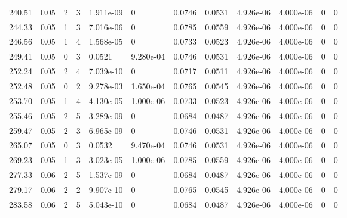 \documentclass[preview]{standalone}
\begin{document}
{{{\begin{tabular}{L{1.2cm}C{1.2cm} C{0.3cm}C{0.5cm} C{1.4cm}C{1.4cm} C{1.4cm}C{1.4cm} C{1.6cm}C{1.6cm} C{1.6cm}C{1.6cm}}
  240.51  &  0.05  & 2     &  3 &  1.911e-09  & 0  &  0.0746&   0.0531& 4.926e-06 & 4.000e-06   &  0 & 0  \\ 
  244.33  &  0.05  & 1     &  3 &  7.016e-06  & 0  &  0.0785&   0.0559& 4.926e-06 & 4.000e-06   &  0 & 0  \\ 
  246.56  &  0.05  & 1     &  4 &  1.568e-05  & 0  &  0.0733&   0.0523& 4.926e-06 & 4.000e-06   &  0 & 0  \\ 
  249.41  &  0.05  & 0     &  3 &  0.0521  & 9.280e-04  &  0.0746&   0.0531& 4.926e-06 & 4.000e-06   &  0 & 0  \\ 
  252.24  &  0.05  & 2     &  4 &  7.039e-10  & 0  &  0.0717&   0.0511& 4.926e-06 & 4.000e-06   &  0 & 0  \\ 
  252.48  &  0.05  & 0     &  2 &  9.278e-03  & 1.650e-04  &  0.0765&   0.0545& 4.926e-06 & 4.000e-06   &  0 & 0  \\ 
  253.70  &  0.05  & 1     &  4 &  4.130e-05  & 1.000e-06  &  0.0733&   0.0523& 4.926e-06 & 4.000e-06   &  0 & 0  \\ 
  255.46  &  0.05  & 2     &  5 &  3.289e-09  & 0  &  0.0684&   0.0487& 4.926e-06 & 4.000e-06   &  0 & 0  \\ 
  259.47  &  0.05  & 2     &  3 &  6.965e-09  & 0  &  0.0746&   0.0531& 4.926e-06 & 4.000e-06   &  0 & 0  \\ 
  265.07  &  0.05  & 0     &  3 &  0.0532  & 9.470e-04  &  0.0746&   0.0531& 4.926e-06 & 4.000e-06   &  0 & 0  \\ 
  269.23  &  0.05  & 1     &  3 &  3.023e-05  & 1.000e-06  &  0.0785&   0.0559& 4.926e-06 & 4.000e-06   &  0 & 0  \\ 
  277.33  &  0.06  & 2     &  5 &  1.537e-09  & 0  &  0.0684&   0.0487& 4.926e-06 & 4.000e-06   &  0 & 0  \\ 
  279.17  &  0.06  & 2     &  2 &  9.907e-10  & 0  &  0.0765&   0.0545& 4.926e-06 & 4.000e-06   &  0 & 0  \\ 
  283.58  &  0.06  & 2     &  5 &  5.043e-10  & 0  &  0.0684&   0.0487& 4.926e-06 & 4.000e-06   &  0 & 0  \\ 
\hline 
\end{tabular} 

}}}
\end{document}
